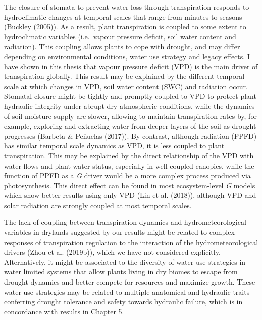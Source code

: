 \documentclass[11pt,twoside]{reedthesis}
\begin{document}
The closure of stomata to prevent water loss through transpiration
responds to hydroclimatic changes at temporal scales that range from
minutes to seasons (Buckley (2005)). As a result, plant transpiration is
coupled to some extent to hydroclimatic variables (i.e.~vapour pressure
deficit, soil water content and radiation). This coupling allows plants
to cope with drought, and may differ depending on environmental
conditions, water use strategy and legacy effects. I have shown in this
thesis that vapour pressure deficit (VPD) is the main driver of
transpiration globally. This result may be explained by the different
temporal scale at which changes in VPD, soil water content (SWC) and
radiation occur. Stomatal closure might be tightly and promptly coupled
to VPD to protect plant hydraulic integrity under abrupt dry atmospheric
conditions, while the dynamics of soil moisture supply are slower,
allowing to maintain transpiration rates by, for example, exploring and
extracting water from deeper layers of the soil as drought progresses
(Barbeta \& Peñuelas (2017)). By contrast, although radiation (PPFD) has
similar temporal scale dynamics as VPD, it is less coupled to plant
transpiration. This may be explained by the direct relationship of the
VPD with water flows and plant water status, especially in well-coupled
canopies, while the function of PPFD as a \emph{G} driver would be a
more complex process produced via photosynthesis. This direct effect can
be found in most ecosystem-level \emph{G} models which show better
results using only VPD (Lin et al. (2018)), although VPD and solar
radiation are strongly coupled at most temporal scales.\par

The lack of coupling between transpiration dynamics and
hydrometeorological variables in drylands suggested by our results might
be related to complex responses of transpiration regulation to the
interaction of the hydrometeorological drivers (Zhou et al. (2019b)),
which we have not considered explicitly. Alternatively, it might be
associated to the diversity of water use strategies in water limited
systems that allow plants living in dry biomes to escape from drought
dynamics and better compete for resources and maximize growth. These
water use strategies may be related to multiple anatomical and hydraulic
traits conferring drought tolerance and safety towards hydraulic
failure, which is in concordance with results in Chapter 5.\par
\end{document}
